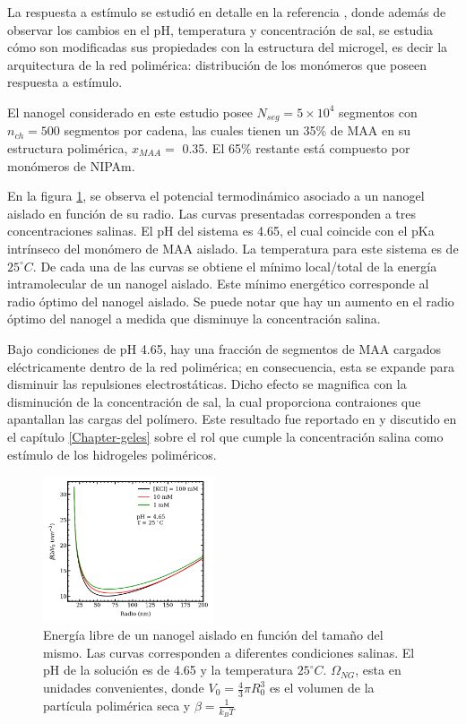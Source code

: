 	La respuesta a est\'imulo se estudi\'o en detalle en la referencia \cite{perez2021thermodynamic}, donde adem\'as de observar los cambios en el pH, temperatura y concentraci\'on de sal, se estudia c\'omo son modificadas sus propiedades con la estructura del microgel, es decir la arquitectura de la red polim\'erica: distribuci\'on de los mon\'omeros que poseen respuesta a est\'imulo.
	
	El nanogel considerado en este estudio posee $N_{seg} = 5 \times 10^4$ segmentos con $n_{ch} = 500$ segmentos por cadena, las cuales tienen un 35\% de MAA en su estructura polim\'erica, $x_{MAA} =$ 0.35. El 65\% restante est\'a compuesto por mon\'omeros de NIPAm.
	
	En la figura \ref{fig:mc:energy-intra}, se observa el potencial termodin\'amico asociado a un nanogel aislado en funci\'on de su radio. Las curvas presentadas corresponden a tres concentraciones salinas. El pH del sistema es 4.65, el cual coincide con el pKa intr\'inseco del mon\'omero de MAA aislado. La temperatura para este sistema es de $25 ^\circ C$. De cada una de las curvas se obtiene el m\'inimo local/total de la energ\'ia intramolecular de un nanogel aislado. Este m\'inimo energ\'etico corresponde al radio \'optimo del nanogel aislado. Se puede notar que hay un aumento en el radio \'optimo del nanogel a medida que disminuye la concentraci\'on salina.
	
	Bajo condiciones de pH 4.65, hay una fracci\'on de segmentos de MAA cargados el\'ectricamente dentro de la red polim\'erica; en consecuencia, esta se expande para disminuir las repulsiones electrost\'aticas. Dicho efecto se magnifica con la disminuci\'on de la concentraci\'on de sal, la cual proporciona contraiones que apantallan las cargas del pol\'imero. Este resultado fue reportado en \cite{perez2021thermodynamic} y discutido en el cap\'itulo \ref{Chapter-geles} sobre el rol que cumple la concentraci\'on salina como est\'imulo de los hidrogeles polim\'ericos.
	
	
	\begin{figure}[!htb]
		\centering
		\includegraphics[width=0.45\textwidth]{Figures/graph-mc/interna.png}
		\caption{Energ\'ia libre de un nanogel aislado en funci\'on del tama\~no del mismo. Las curvas corresponden a diferentes condiciones salinas. El pH de la soluci\'on es de 4.65 y la temperatura $25 ^\circ C$. $\Omega_{NG}$, esta en unidades convenientes, donde $V_0=\frac{4}{3}\pi R_0^3$ es el volumen de la part\'icula polim\'erica seca y $\beta = \frac{1}{k_B T}$}
		\label{fig:mc:energy-intra}
	\end{figure}
	

